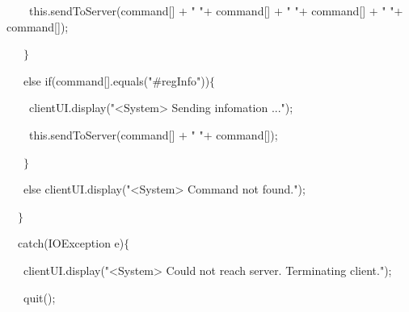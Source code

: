 {{\hlstd }{\hlstd\ \ \ \ }{\hlstd }{\hlkwa this}{\hlstd }{\hlsym .}{\hlstd }{\hlkwd sendToServer}{\hlstd }{\hlsym (}{\hlstd command}{\hlsym [}{\hlstd }{}{\hlstd }{\hlsym ] $\mathord{+}$ }{\hlstd }{\hlstr " "}{\hlstd  }{\hlsym $\mathord{+}$ }{\hlstd command}{\hlsym [}{\hlstd }{}{\hlstd }{\hlsym ] $\mathord{+}$ }{\hlstd }{\hlstr " "}{\hlstd  }{\hlsym $\mathord{+}$ }{\hlstd command}{\hlsym [}{\hlstd }{}{\hlstd }{\hlsym ] $\mathord{+}$ }{\hlstd }{\hlstr " "}{\hlstd  }{\hlsym $\mathord{+}$ }{\hlstd command}{\hlsym [}{\hlstd }{}{\hlstd }{\hlsym ]);}\leavevmode\par
{\hlstd }{\hlstd\ \ \ }{\hlstd }{\hlsym $\}$}\leavevmode\par
{\hlstd }{\hlstd\ \ \ }{\hlstd }{\hlkwa else if}{\hlstd }{\hlsym (}{\hlstd command}{\hlsym [}{\hlstd }{}{\hlstd }{\hlsym ].}{\hlstd }{\hlkwd equals}{\hlstd }{\hlsym (}{\hlstd }{\hlstr "\#regInfo"}{\hlstd }{\hlsym ))$\{$}\leavevmode\par
{\hlstd }{\hlstd\ \ \ \ }{\hlstd clientUI}{\hlsym .}{\hlstd }{\hlkwd display}{\hlstd }{\hlsym (}{\hlstd }{\hlstr "$\mathord{<}$System$\mathord{>}$ Sending infomation ..."}{\hlstd }{\hlsym );}\leavevmode\par
{\hlstd }{\hlstd\ \ \ \ }{\hlstd }{\hlkwa this}{\hlstd }{\hlsym .}{\hlstd }{\hlkwd sendToServer}{\hlstd }{\hlsym (}{\hlstd command}{\hlsym [}{\hlstd }{}{\hlstd }{\hlsym ] $\mathord{+}$ }{\hlstd }{\hlstr " "}{\hlstd  }{\hlsym $\mathord{+}$ }{\hlstd command}{\hlsym [}{\hlstd }{}{\hlstd }{\hlsym ]);}\leavevmode\par
{\hlstd }{\hlstd\ \ \ }{\hlstd }{\hlsym $\}$}\leavevmode\par
{\hlstd }{\hlstd\ \ \ }{\hlstd }{\hlkwa else }{\hlstd clientUI}{\hlsym .}{\hlstd }{\hlkwd display}{\hlstd }{\hlsym (}{\hlstd }{\hlstr "$\mathord{<}$System$\mathord{>}$ Command not found."}{\hlstd }{\hlsym );}\leavevmode\par
{\hlstd }{\hlstd\ \ }{\hlstd }{\hlsym $\}$}\leavevmode\par
{\hlstd }{\hlstd\ \ }{\hlstd }{\hlkwa catch}{\hlstd }{\hlsym (}{\hlstd }{\hlkwc IOException }{\hlstd e}{\hlsym )$\{$}\leavevmode\par
{\hlstd }{\hlstd\ \ \ }{\hlstd clientUI}{\hlsym .}{\hlstd }{\hlkwd display}{\hlstd }{\hlsym (}{\hlstd }{\hlstr "$\mathord{<}$System$\mathord{>}$ Could not reach server. Terminating client."}{\hlstd }{\hlsym );}\leavevmode\par
{\hlstd }{\hlstd\ \ \ }{\hlstd }{\hlkwd quit}{\hlstd }{\hlsym ();}\leavevmode\par
}
